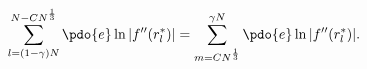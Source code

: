 \begin{equation}
\label{Eq_A21}
\sum^{N-CN^{\frac{1}{3}}}_{l=(1-\gamma)N} \pdo{e} \ln |f''(r^{*}_l)|
  = \sum^{\gamma N}_{m = CN^{\frac{1}{3}}}  \pdo{e} \ln |f''(r^{*}_l)|.
\end{equation}

